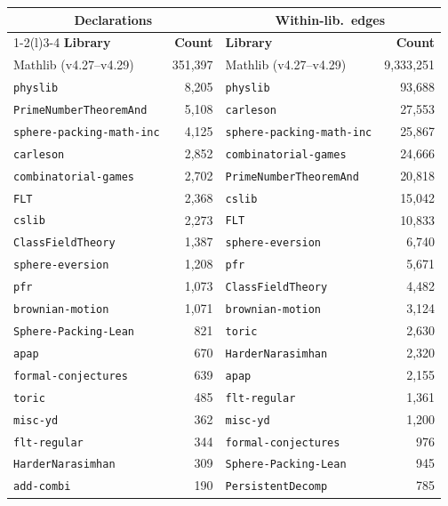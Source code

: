 \begin{table}[H]
\centering\scriptsize
\setlength{\tabcolsep}{3pt}
\begin{tabular}{lrlr}
\toprule
\multicolumn{2}{c}{\textbf{Declarations}} & \multicolumn{2}{c}{\textbf{Within-lib.\ edges}} \\
\cmidrule(r){1-2}\cmidrule(l){3-4}
\textbf{Library} & \textbf{Count} & \textbf{Library} & \textbf{Count} \\
\midrule
Mathlib (v4.27--v4.29) & 351{,}397 & Mathlib (v4.27--v4.29) & 9{,}333{,}251 \\
\midrule
\texttt{physlib} & 8{,}205 & \texttt{physlib} & 93{,}688 \\
\texttt{PrimeNumberTheoremAnd} & 5{,}108 & \texttt{carleson} & 27{,}553 \\
\texttt{sphere-packing-math-inc} & 4{,}125 & \texttt{sphere-packing-math-inc} & 25{,}867 \\
\texttt{carleson} & 2{,}852 & \texttt{combinatorial-games} & 24{,}666 \\
\texttt{combinatorial-games} & 2{,}702 & \texttt{PrimeNumberTheoremAnd} & 20{,}818 \\
\texttt{FLT} & 2{,}368 & \texttt{cslib} & 15{,}042 \\
\texttt{cslib} & 2{,}273 & \texttt{FLT} & 10{,}833 \\
\texttt{ClassFieldTheory} & 1{,}387 & \texttt{sphere-eversion} & 6{,}740 \\
\texttt{sphere-eversion} & 1{,}208 & \texttt{pfr} & 5{,}671 \\
\texttt{pfr} & 1{,}073 & \texttt{ClassFieldTheory} & 4{,}482 \\
\texttt{brownian-motion} & 1{,}071 & \texttt{brownian-motion} & 3{,}124 \\
\texttt{Sphere-Packing-Lean} & 821 & \texttt{toric} & 2{,}630 \\
\texttt{apap} & 670 & \texttt{HarderNarasimhan} & 2{,}320 \\
\texttt{formal-conjectures} & 639 & \texttt{apap} & 2{,}155 \\
\texttt{toric} & 485 & \texttt{flt-regular} & 1{,}361 \\
\texttt{misc-yd} & 362 & \texttt{misc-yd} & 1{,}200 \\
\texttt{flt-regular} & 344 & \texttt{formal-conjectures} & 976 \\
\texttt{HarderNarasimhan} & 309 & \texttt{Sphere-Packing-Lean} & 945 \\
\texttt{add-combi} & 190 & \texttt{PersistentDecomp} & 785 \\

\end{tabular}
\end{table}
